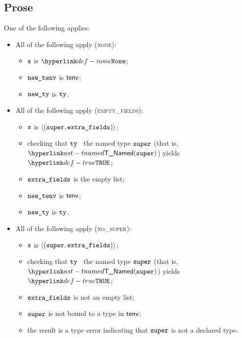 \subsection{Prose}
One of the following applies:
\begin{itemize}
  \item All of the following apply (\textsc{none}):
  \begin{itemize}
    \item $\texttt{s}$ is $\None$;
    \item $\texttt{new\_tenv}$ is $\textsf{tenv}$;
    \item $\texttt{new\_ty}$ is $\texttt{ty}$.
  \end{itemize}

  \item All of the following apply (\textsc{empty\_fields}):
  \begin{itemize}
    \item $\texttt{s}$ is $\langle(\texttt{super}, \texttt{extra\_fields})\rangle$;
    \item checking that $\texttt{ty}$ \subtypesatisfies\ the named type $\texttt{super}$ (that is, \\ $\TNamed(\vsuper)$) yields
          $\True$\ProseOrTypeError;
    \item $\texttt{extra\_fields}$ is the empty list;
    \item $\texttt{new\_tenv}$ is $\textsf{tenv}$;
    \item $\texttt{new\_ty}$ is $\texttt{ty}$.
  \end{itemize}

  \item All of the following apply (\textsc{no\_super}):
  \begin{itemize}
    \item $\texttt{s}$ is $\langle(\texttt{super}, \texttt{extra\_fields})\rangle$;
    \item checking that $\texttt{ty}$ \subtypesatisfies\ the named type $\texttt{super}$ (that is, \\ $\TNamed(\vsuper)$) yields
          $\True$\ProseOrTypeError;
    \item $\texttt{extra\_fields}$ is not an empty list;
    \item $\texttt{super}$ is not bound to a type in $\textsf{tenv}$;
    \item the result is a type error indicating that $\texttt{super}$ is not a declared type.
  \end{itemize}


\end{itemize}
